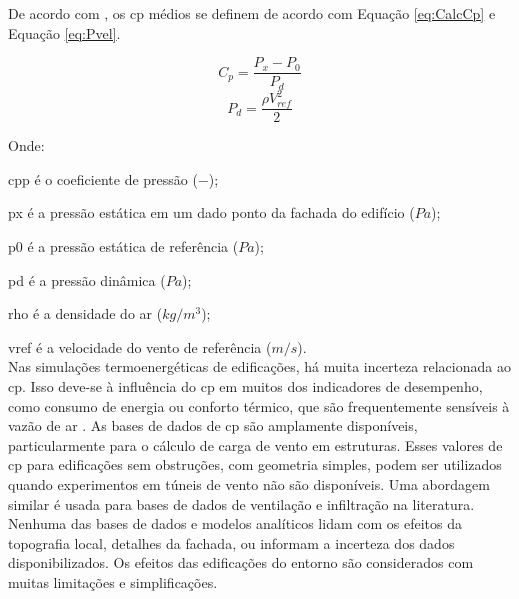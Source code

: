 \documentclass[brazil,hardcopy,openany]{ufscthesis} %
\begin{document}
De acordo com , os \acrshort{cp} médios se definem de acordo com Equação \ref{eq:CalcCp} e Equação \ref{eq:Pvel}.

\begin{equation}\label{eq:CalcCp}
C_p = \frac{P_x - P_0}{P_d}
\end{equation}
\begin{equation}\label{eq:Pvel}
P_d = \frac{\rho V^{2}_{ref}}{2}
\end{equation}

Onde:

\gls{cpp} é o coeficiente de pressão ($-$);

\gls{px} é a pressão estática em um dado ponto da fachada do edifício ($Pa$);

\gls{p0} é a pressão estática de referência ($Pa$);

\gls{pd} é a pressão dinâmica ($Pa$);

\gls{rho} é a densidade do ar ($kg/m^3$);

\gls{vref} é a velocidade do vento de referência ($m/s$).
\\

Nas simulações termoenergéticas de edificações, há muita incerteza relacionada ao \acrshort{cp}. Isso deve-se à influência do \acrshort{cp} em muitos dos indicadores de desempenho, como consumo de energia ou conforto térmico, que são frequentemente sensíveis à vazão de ar \cite{Costola2009}. 
As bases de dados de \acrshort{cp} são amplamente disponíveis, particularmente para o cálculo de carga de vento em estruturas. Esses valores de \acrshort{cp} para edificações sem obstruções, com geometria simples, podem ser utilizados quando experimentos em túneis de vento não são disponíveis. Uma abordagem similar é usada para bases de dados de ventilação e infiltração na literatura. Nenhuma das bases de dados e modelos analíticos lidam com os efeitos da topografia local, detalhes da fachada, ou informam a incerteza dos dados disponibilizados. Os efeitos das edificações do entorno são considerados com muitas limitações e simplificações.
\end{document}
